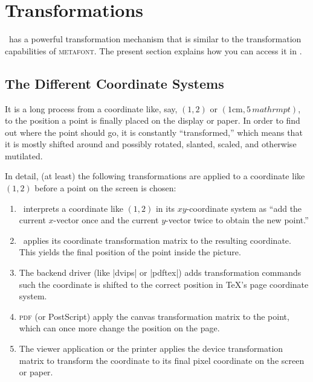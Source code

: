 %


\section{Transformations}

\pgfname\ has a powerful transformation mechanism that is similar to
the transformation capabilities of \textsc{metafont}. The present
section explains how you can access it in \tikzname.


\subsection{The Different Coordinate Systems}

It is a long process from  a coordinate like, say, $(1,2)$ or
$(1\mathrm{cm},5\,mathrm{pt})$, to the position a point is finally
placed on the display or paper. In order to find out where the point
should go, it is constantly ``transformed,'' which means that it is
mostly shifted around and possibly rotated, slanted, scaled, and
otherwise mutilated. 

In detail, (at least) the following transformations are applied to a
coordinate like $(1,2)$ before a point on the screen is chosen:
\begin{enumerate}
\item
  \pgfname\ interprets a coordinate like $(1,2)$  in its
  $xy$-coordinate system as ``add the current $x$-vector once and the
  current $y$-vector twice to obtain the new point.''
\item
  \pgfname\ applies its coordinate transformation matrix to the
  resulting coordinate. This yields the final position of the point 
  inside the picture.
\item
  The backend driver (like |dvips| or |pdftex|) adds transformation
  commands such the coordinate is shifted to the correct position in
  \TeX's page coordinate system.
\item
  \textsc{pdf} (or PostScript) apply the canvas transformation
  matrix to the point, which can once more change the position on the
  page. 
\item
  The viewer application or the printer applies the device
  transformation matrix to transform the coordinate to its final pixel
  coordinate on the screen or paper.  
\end{enumerate}

